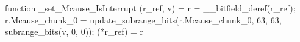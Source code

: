 function _set_Mcause_IsInterrupt (r_ref, v) = {
    r = __bitfield_deref(r_ref);
    r.Mcause_chunk_0 = update_subrange_bits(r.Mcause_chunk_0, 63, 63, subrange_bits(v, 0, 0));
    (*r_ref) = r
}
